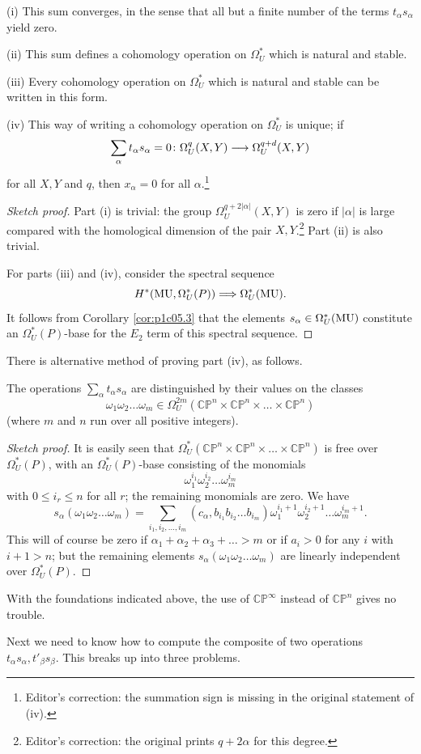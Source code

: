 \documentclass[../main]{subfiles}
\begin{document}
\begin{theorem}[Novikov]\label{thm:pc1c06.1}
(i) This sum converges, in the sense that all but a finite number of the terms $t_\alpha s_\alpha$ yield zero.

(ii) This sum defines a cohomology operation on $\Omega^*_U$ which is natural and stable.

(iii) Every cohomology operation on $\Omega_U^*$ which is natural and stable can be written in this form.

(iv) This way of writing a cohomology operation on $\Omega_U^*$ is unique; if 
    \[\sum_\alpha t_\alpha s_\alpha = 0 \colon \Omega^q_U(X,Y) \longrightarrow \Omega^{q+d}_U(X,Y)\]
    for all $X,Y$ and $q$, then $x_\alpha = 0$ for all $\alpha$.\footnote{Editor's correction: the summation sign is missing in the original statement of (iv).}
\end{theorem}
\begin{proof}[Sketch proof]
Part (i) is trivial: the group $\Omega_U^{q+2|\alpha|}(X,Y)$ is zero if $|\alpha|$ is large compared with the homological dimension of the pair $X,Y$.\footnote{Editor's correction: the original prints $q+2\alpha$ for this degree.} Part (ii) is also trivial.

For parts (iii) and (iv), consider the spectral sequence
\[H^*(\mathrm{MU},\Omega_U^*(P)) \Longrightarrow \Omega^*_U(\mathrm{MU}).\]
It follows from Corollary \ref{cor:p1c05.3} that the elements $s_\alpha \in \Omega^*_U(\mathrm{MU})$ constitute an $\Omega_U^*(P)$-base for the $E_2$ term of this spectral sequence.
\end{proof}
There is alternative method of proving part (iv), as follows.
\begin{remark}[Novikov]\label{rmk:p1c06.2}
The operations $\sum_\alpha t_\alpha s_\alpha$ are distinguished by their values on the classes
\[\omega_1 \omega_2 \dots \omega_m \in \Omega_U^{2m}(\mathbb{CP}^n \times \mathbb{CP}^n \times \dots \times \mathbb{CP}^n)\]
(where $m$ and $n$ run over all positive integers).
\end{remark}
\begin{proof}[Sketch proof]
It is easily seen that $\Omega_U^*(\mathbb{CP}^n \times \mathbb{CP}^n \times \dots \times \mathbb{CP}^n)$ is free over $\Omega_U^*(P)$, with an $\Omega_U^*(P)$-base consisting of the monomials
\[\omega_1^{i_1} \omega_2^{i_2} \dots \omega_m^{i_m}\]
with $0 \leq i_r \leq n$ for all $r$; the remaining monomials are zero. We have \[s_\alpha(\omega_1\omega_2\dots\omega_m) = \sum_{i_1,i_2,\dots,i_m} (c_\alpha,b_{i_1} b_{i_2} \dots b_{i_m})\omega_1^{i_1 +1} \omega_2^{i_2+1} \dots \omega_m^{i_m + 1}.\]
This will of course be zero if $\alpha_1 + \alpha_2 + \alpha_3 + \dots > m$ or if $a_i > 0$ for any $i$ with $i+1 > n$; but the remaining elements $s_\alpha(\omega_1 \omega_2 \dots \omega_m)$ are linearly independent over $\Omega_U^*(P)$.
\end{proof}
\begin{note}
With the foundations indicated above, the use of $\mathbb{CP}^\infty$ instead of $\mathbb{CP}^n$ gives no trouble.
\end{note}
Next we need to know how to compute the composite of two operations $t_\alpha s_\alpha, t'_\beta s_\beta$. This breaks up into three problems.
\end{document}
